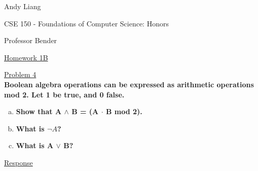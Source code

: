 \documentclass[12pt]{article}
\begin{document}
\begin{flushleft}
Andy Liang

CSE 150 - Foundations of Computer Science: Honors

Professor Bender
\end{flushleft}
\medskip
\centerline{\uline{Homework 1B}}
\bigskip\bigskip

\noindent
\uline{Problem 4}
\\\textbf{Boolean algebra operations can be expressed as arithmetic operations mod 2. Let 1 be true, and 0 false.}
\begin{enumerate}[(a)]
\item \textbf{Show that A $\land$ B = (A $\cdot$ B mod 2).}
\item \textbf{What is $\neg A$?}
\item \textbf{What is A $\lor$ B?}
\end{enumerate}
\medskip
\uline{Response}
\end{document}
